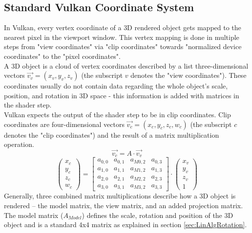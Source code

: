 \subsection{Standard Vulkan Coordinate System}
In Vulkan, every vertex coordinate of a 3D rendered object gets mapped to the nearest pixel in the viewport window. This vertex mapping is done in multiple steps from "view coordinates" via "clip coordinates" towards "normalized device coordinates" to the "pixel coordinates".\\
A 3D object is a cloud of vertex coordinates described by a list three-dimensional vectors $\overrightarrow{v_{v}} = (x_{v},y_{v},z_{v})$ (the subscript $v$ denotes the "view coordinates"). These coordinates usually do not contain data regarding the whole object's scale, position, and rotation in 3D space - this information is added with matrices in the shader step.\\
Vulkan expects the output of the shader step to be in clip coordinates. Clip coordinates are four-dimensional vectors $\overrightarrow{v_{c}} = (x_{c},y_{c},z_{c},w_{c})$ (the subscript $c$ denotes the "clip coordinates") and the result of a matrix multiplication operation.\\
\begin{equation*}  
    \overrightarrow{v_{c}} = A \cdot  \overrightarrow{v_{v}}
\end{equation*}
\begin{equation*}
    \begin{pmatrix}
    x_{c}  \\
    y_{c}  \\
    z_{c}  \\
    w_{c}
    \end{pmatrix} 
    = 
    \begin{bmatrix}
a_{0,0} & a_{0,1} & a_{M 0,2} &  a_{0,3} \\
a_{1,0} & a_{1,1} & a_{M 1,2} &  a_{1,3} \\
a_{2,0} & a_{2,1} & a_{M 2,2} &  a_{2,3} \\
a_{3,0} & a_{3,1} & a_{M 3,2} & a_{3,3}
\end{bmatrix}
\cdot 
\begin{pmatrix}
    x_{v}  \\
    y_{v}  \\
    z_{v}  \\
    1
    \end{pmatrix}
\end{equation*}
Generally, three combined matrix multiplications describe how a 3D object is rendered – the model matrix, the view matrix, and an added projection matrix. The model matrix ($A_{Model}$) defines the scale, rotation and position of the 3D object and is a standard 4x4 matrix as explained in section \ref{sec:LinAlgRotation}.\\ 

